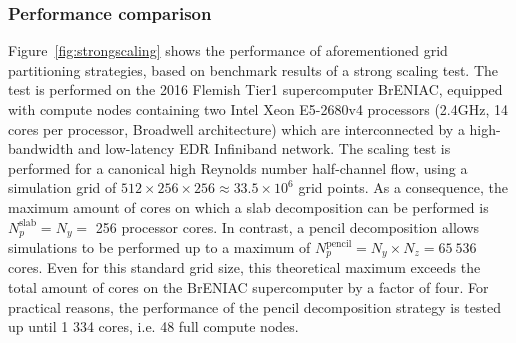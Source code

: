 
\subsubsection{Performance comparison}
Figure~\ref{fig:strongscaling} shows the performance of aforementioned grid partitioning strategies, based on benchmark results of a strong scaling test. The test is performed on the 2016 Flemish Tier1 supercomputer BrENIAC, equipped with compute nodes containing two Intel Xeon E5-2680v4 processors (2.4GHz, 14 cores per processor, Broadwell architecture) which are interconnected by a high-bandwidth and low-latency EDR Infiniband network. The scaling test is performed for a canonical high Reynolds number half-channel flow, using a simulation grid of $512 \times 256 \times 256 \approx 33.5 \times 10^6$ grid points. As a consequence, the maximum amount of cores on which a slab decomposition can be performed is $N_p^{\text{slab}} = N_y = $ 256 processor cores. In contrast, a pencil decomposition allows simulations to be performed up to a maximum of $N_p^{\text{pencil}} = N_y \times N_z = 65~536$ cores. Even for this standard grid size, this theoretical maximum exceeds the total amount of cores on the BrENIAC supercomputer by a factor of four. For practical reasons, the performance of the pencil decomposition strategy is tested up until 1 334 cores, i.e. 48 full compute nodes. 

